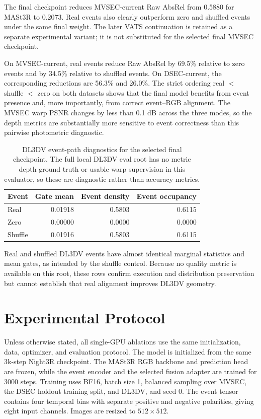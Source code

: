 \documentclass[10pt]{article}
\begin{document}
The final checkpoint reduces MVSEC-current Raw AbsRel from 0.5880 for MASt3R
to 0.2073.  Real events also clearly outperform zero and shuffled events under
the same final weight.  The later VATS continuation is retained as a separate
experimental variant; it is not substituted for the selected final MVSEC
checkpoint.

On MVSEC-current, real events reduce Raw AbsRel by 69.5\% relative to zero
events and by 34.5\% relative to shuffled events.  On DSEC-current, the
corresponding reductions are 56.3\% and 26.0\%.  The strict ordering
real $<$ shuffle $<$ zero on both datasets shows that the final model benefits
from event presence and, more importantly, from correct event--RGB alignment.
The MVSEC warp PSNR changes by less than 0.1 dB across the three modes, so the
depth metrics are substantially more sensitive to event correctness than this
pairwise photometric diagnostic.

\begin{table}[h]
\centering
\caption{DL3DV event-path diagnostics for the selected final checkpoint.  The
full local DL3DV eval root has no metric depth ground truth or usable warp
supervision in this evaluator, so these are diagnostic rather than accuracy
metrics.}
\label{tab:final-dl3dv-control}
\begin{tabular}{lrrr}
\toprule
Event & Gate mean & Event density & Event occupancy \\
\midrule
Real & 0.01918 & 0.5803 & 0.6115 \\
Zero & 0.00000 & 0.0000 & 0.0000 \\
Shuffle & 0.01916 & 0.5803 & 0.6115 \\
\bottomrule
\end{tabular}
\end{table}

Real and shuffled DL3DV events have almost identical marginal statistics and
mean gates, as intended by the shuffle control.  Because no quality metric is
available on this root, these rows confirm execution and distribution
preservation but cannot establish that real alignment improves DL3DV geometry.

\section{Experimental Protocol}

Unless otherwise stated, all single-GPU ablations use the same initialization,
data, optimizer, and evaluation protocol.  The model is initialized from the
same 3k-step Night3R checkpoint.  The MASt3R RGB backbone and prediction head
are frozen, while the event encoder and the selected fusion adapter are trained
for 3000 steps.  Training uses BF16, batch size 1, balanced sampling over
MVSEC, the DSEC holdout training split, and DL3DV, and seed 0.  The event tensor
contains four temporal bins with separate positive and negative polarities,
giving eight input channels.  Images are resized to $512\times512$.
\end{document}

